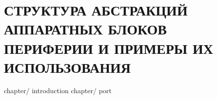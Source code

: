\part{СТРУКТУРА АБСТРАКЦИЙ АППАРАТНЫХ БЛОКОВ ПЕРИФЕРИИ И ПРИМЕРЫ ИХ ИСПОЛЬЗОВАНИЯ}\label{module:op}
		
	{chapter/}	{introduction}					%
	{chapter/}	{port}							%
